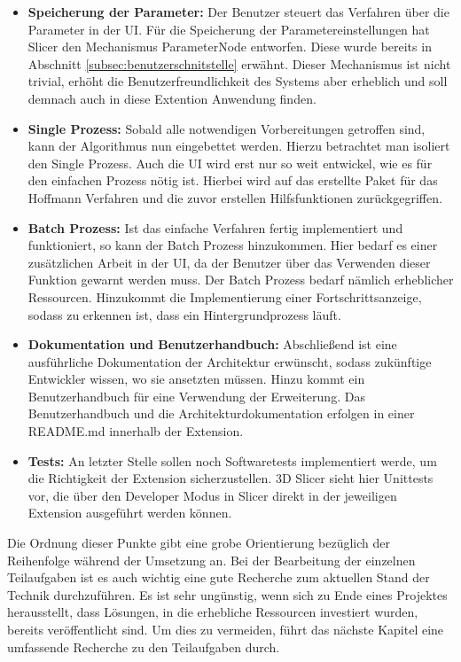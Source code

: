 \begin{itemize}
	\item \textbf{Speicherung der Parameter:} Der Benutzer steuert das Verfahren
		über die Parameter in der UI. Für die Speicherung der Parametereinstellungen
		hat Slicer den Mechanismus ParameterNode entworfen. Diese wurde bereits in
		Abschnitt \ref{subsec:benutzerschnitstelle} erwähnt. Dieser Mechanismus ist nicht
		trivial, erhöht die Benutzerfreundlichkeit des Systems aber erheblich und
		soll demnach auch in diese Extention Anwendung finden.

	\item \textbf{Single Prozess:} Sobald alle notwendigen Vorbereitungen
		getroffen sind, kann der Algorithmus nun eingebettet werden. Hierzu
		betrachtet man isoliert den Single Prozess. Auch die UI wird erst nur so weit
		entwickel, wie es für den einfachen Prozess nötig ist. Hierbei wird auf das erstellte
		Paket für das Hoffmann Verfahren und die zuvor erstellen Hilfsfunktionen zurückgegriffen.

	\item \textbf{Batch Prozess:} Ist das einfache Verfahren fertig implementiert
		und funktioniert, so kann der Batch Prozess hinzukommen. Hier bedarf es
		einer zusätzlichen Arbeit in der UI, da der Benutzer über das Verwenden dieser
		Funktion gewarnt werden muss. Der Batch Prozess bedarf nämlich erheblicher
		Ressourcen. Hinzukommt die Implementierung einer Fortschrittsanzeige, sodass
		zu erkennen ist, dass ein Hintergrundprozess läuft.

	\item \textbf{Dokumentation und Benutzerhandbuch:} Abschließend ist eine
		ausführliche Dokumentation der Architektur erwünscht, sodass zukünftige Entwickler
		wissen, wo sie ansetzten müssen. Hinzu kommt ein Benutzerhandbuch für eine Verwendung
		der Erweiterung. Das Benutzerhandbuch und die Architekturdokumentation
		erfolgen in einer README.md innerhalb der Extension.

	\item \textbf{Tests:} An letzter Stelle sollen noch Softwaretests
		implementiert werde, um die Richtigkeit der Extension sicherzustellen. 3D
		Slicer sieht hier Unittests vor, die über den Developer Modus in Slicer direkt
		in der jeweiligen Extension ausgeführt werden können.
\end{itemize}

Die Ordnung dieser Punkte gibt eine grobe Orientierung bezüglich der Reihenfolge
während der Umsetzung an. Bei der Bearbeitung der einzelnen Teilaufgaben ist es auch
wichtig eine gute Recherche zum aktuellen Stand der Technik durchzuführen. Es
ist sehr ungünstig, wenn sich zu Ende eines Projektes herausstellt, dass
Lösungen, in die erhebliche Ressourcen investiert wurden, bereits veröffentlicht
sind. Um dies zu vermeiden, führt das nächste Kapitel eine umfassende Recherche
zu den Teilaufgaben durch.

